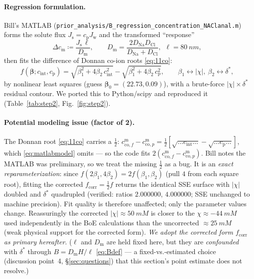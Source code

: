 \documentclass[11pt]{article}
\newcommand{\note}[1]{{\color{blue}\textsf{(#1)}}}
\newcommand{\cm}[1]{{c^{\mathrm{m}}_{#1}}}
\newcommand{\co}{\mathrm{co}}
\newcommand{\Jw}{J_{\mathrm{w}}}
\newcommand{\Js}{J_{\mathrm{s}}}
\newcommand{\dstar}{\delta^{*}}
\newcommand{\Dm}{D_{\mathrm{m}}}
\newcommand{\cint}{c_{\mathrm{int}}}
\newcommand{\cp}{c_{\mathrm{p}}}
\begin{document}
\paragraph{Regression formulation.} Bill's MATLAB
(\texttt{prior\_analysis/\allowbreak{}B\_\allowbreak{}regression\_\allowbreak{}concentration\_\allowbreak{}NAClanal.m}) forms the solute
flux $\Js=\cp\Jw$ and the transformed ``response''
\begin{equation}
  \Delta c_{\mathrm m} \coloneqq \frac{\Js\,\ell}{\Dm},
  \qquad \Dm=\frac{2D_{\text{Na}}D_{\text{Cl}}}{D_{\text{Na}}+D_{\text{Cl}}},\ \ \ell=\SI{80}{nm},
  \label{eq:deltacm}
\end{equation}
then fits the difference of Donnan co-ion roots \eqref{eq:11co}:
\begin{equation}
  f(\boldsymbol\beta;\cint,\cp)=
    \sqrt{\beta_1^2 + 4\beta_2\,\cint^2} - \sqrt{\beta_1^2 + 4\beta_2\,\cp^2},
  \qquad \beta_1 \leftrightarrow |\chi|,\ \beta_2 \leftrightarrow \dstar,
  \label{eq:matlabmodel}
\end{equation}
by nonlinear least squares (guess $\boldsymbol\beta_0=(22.73,0.09)$), with a
brute-force $|\chi|\times\dstar$ residual contour. We ported this to Python/scipy
and reproduced it (Table~\ref{tab:step2}, Fig.~\ref{fig:step2}).

\paragraph{Potential modeling issue (factor of 2).} The Donnan root \eqref{eq:11co}
carries a $\tfrac12$: $\cm{\co,f}-\cm{\co,p}=\tfrac12[\sqrt{\dots\cint\dots}-\sqrt{\dots\cp\dots}]$,
which \eqref{eq:matlabmodel} omits --- so the code fits $2(\cm{\co,f}-\cm{\co,p})$.
Bill notes the MATLAB was preliminary, so we treat the missing $\tfrac12$ as a
bug. It is an \emph{exact reparameterization}: since $f(2\beta_1,4\beta_2)=2f(\beta_1,\beta_2)$
(pull $4$ from each square root), fitting the corrected
$f_{\text{corr}}=\tfrac12 f$ returns the identical SSE surface with $|\chi|$
doubled and $\dstar$ quadrupled (verified: ratios $2.000000$, $4.000000$; SSE
unchanged to machine precision). Fit quality is therefore unaffected; only the
parameter values change. Reassuringly the corrected $|\chi|\approx\SI{50}{mM}$ is
closer to the $\chi\approx\SI{-44}{mM}$ used independently in the BoE
calculations \cite{boeDoc} than the uncorrected $\approx\SI{25}{mM}$ (weak
physical support for the corrected form). \emph{We
adopt the corrected form $f_{\text{corr}}$ as primary hereafter.} \note{$\ell$
and $\Dm$ are held fixed here, but they are \emph{confounded} with $\dstar$
through $B=\Dm H/\ell$ \eqref{eq:Bdef} --- a fixed-vs.-estimated choice
(discussion point~4, \S\ref{sec:questions}) that this section's point estimate
does not resolve.}
\end{document}
